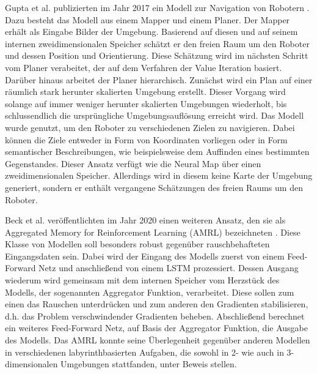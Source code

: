 Gupta et al. publizierten im Jahr 2017 ein Modell zur Navigation von Robotern \cite{MappingPlanning}. Dazu besteht das Modell aus einem Mapper und einem Planer. Der Mapper erhält als Eingabe Bilder der Umgebung. Basierend auf diesen und auf seinem internen zweidimensionalen Speicher schätzt er den freien Raum um den Roboter und dessen Position und Orientierung. Diese Schätzung wird im nächsten Schritt vom Planer verabeitet, der auf dem Verfahren der Value Iteration basiert. Darüber hinaus arbeitet der Planer hierarchisch. Zunächst wird ein Plan auf einer räumlich stark herunter skalierten Umgebung erstellt. Dieser Vorgang wird solange auf immer weniger herunter skalierten Umgebungen wiederholt, bis schlussendlich die ursprüngliche Umgebungsauflösung erreicht wird. Das Modell wurde genutzt, um den Roboter zu verschiedenen Zielen zu navigieren. Dabei können die Ziele entweder in Form von Koordinaten vorliegen oder in Form semantischer Beschreibungen, wie beispielsweise dem Auffinden eines bestimmten Gegenstandes. Dieser Ansatz verfügt wie die Neural Map über einen zweidimensionalen Speicher. Allerdings wird in diesem keine Karte der Umgebung generiert, sondern er enthält vergangene Schätzungen des freien Raums um den Roboter.

Beck et al. veröffentlichten im Jahr 2020 einen weiteren Ansatz, den sie als Aggregated Memory for Reinforcement Learning (AMRL) bezeichneten \cite{AMRL}. Diese Klasse von Modellen soll besonders robust gegenüber rauschbehafteten Eingangsdaten sein. Dabei wird der Eingang des Modells zuerst von einem Feed-Forward Netz und anschließend von einem LSTM prozessiert. Dessen Ausgang wiederum wird gemeinsam mit dem internen Speicher vom Herzstück des Modells, der sogenannten Aggregator Funktion, verarbeitet. Diese sollen zum einen das Rauschen unterdrücken und zum anderen den Gradienten stabilisieren, d.h. das Problem verschwindender Gradienten beheben. Abschließend berechnet ein weiteres Feed-Forward Netz, auf Basis der Aggregator Funktion, die Ausgabe des Modells. Das AMRL konnte seine Überlegenheit gegenüber anderen Modellen in verschiedenen labyrinthbasierten Aufgaben, die sowohl in 2- wie auch in 3-dimensionalen Umgebungen stattfanden, unter Beweis stellen.
